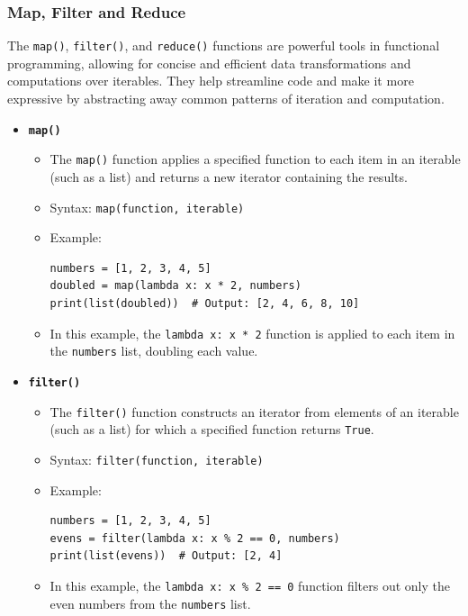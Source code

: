 \subsubsection{Map, Filter and Reduce}
The \texttt{map()}, \texttt{filter()}, and \texttt{reduce()} functions are powerful tools in functional programming, allowing for concise and efficient data transformations and computations over iterables. They help streamline code and make it more expressive by abstracting away common patterns of iteration and computation.
\begin{itemize}
    \item \textbf{\texttt{map()}}
    \begin{itemize}
        \item The \texttt{map()} function applies a specified function to each item in an iterable (such as a list) and returns a new iterator containing the results.
        \item Syntax: \texttt{map(function, iterable)}
        \item Example:
\begin{codebox}
\begin{verbatim}
numbers = [1, 2, 3, 4, 5]
doubled = map(lambda x: x * 2, numbers)
print(list(doubled))  # Output: [2, 4, 6, 8, 10]
\end{verbatim}
\end{codebox}
        \item In this example, the \texttt{lambda x: x * 2} function is applied to each item in the \texttt{numbers} list, doubling each value.
    \end{itemize}
    
    \item \textbf{\texttt{filter()}}
    \begin{itemize}
        \item The \texttt{filter()} function constructs an iterator from elements of an iterable (such as a list) for which a specified function returns \texttt{True}.
        \item Syntax: \texttt{filter(function, iterable)}
        \item Example:
\begin{codebox}
\begin{verbatim}
numbers = [1, 2, 3, 4, 5]
evens = filter(lambda x: x % 2 == 0, numbers)
print(list(evens))  # Output: [2, 4]
\end{verbatim}
\end{codebox}
        \item In this example, the \texttt{lambda x: x \% 2 == 0} function filters out only the even numbers from the \texttt{numbers} list.
    \end{itemize}
    

\end{itemize}
